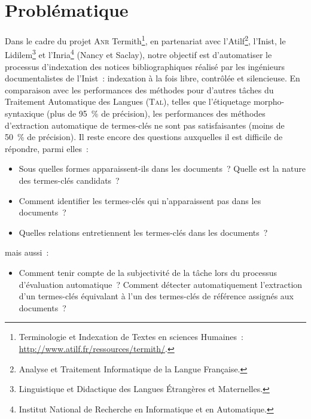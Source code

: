    \section{Problématique}
      Dans le cadre du projet \textsc{Anr} Termith\footnote{Terminologie et
      Indexation de Textes en sciences Humaines~:
      \url{http://www.atilf.fr/ressources/termith/}.}, en partenariat avec
      l'Atilf\footnote{Analyse et Traitement Informatique de la Langue
      Française.}, l'Inist, le Lidilem\footnote{Linguistique et Didactique des
      Langues Étrangères et Maternelles.} et l'Inria\footnote{Institut National
      de Recherche en Informatique et en Automatique.} (Nancy et Saclay), notre
      objectif est d'automatiser le processus d'indexation des notices
      bibliographiques réalisé par les ingénieurs documentalistes de l'Inist~:
      indexation à la fois libre, contrôlée et silencieuse. En comparaison avec
      les performances des méthodes pour d'autres tâches du Traitement
      Automatique des Langues (\textsc{Tal}), telles que l'étiquetage
      morpho-syntaxique (plus de 95~\% de précision), les performances des
      méthodes d'extraction automatique de termes-clés ne sont pas
      satisfaisantes (moins de 50~\% de précision). Il reste encore des
      questions auxquelles il est difficile de répondre, parmi elles~:
      \begin{itemize}
        \item{Sous quelles formes apparaissent-ils dans les documents~? Quelle
              est la nature des termes-clés candidats~?}
        \item{Comment identifier les termes-clés qui n'apparaissent pas dans les
              documents~?}
        \item{Quelles relations entretiennent les termes-clés dans les
              documents~?}
      \end{itemize}
      mais aussi~:
      \begin{itemize}
        \item{Comment tenir compte de la subjectivité de la tâche lors du
              processus d'évaluation automatique~? Comment détecter
              automatiquement l'extraction d'un termes-clés équivalant à l'un
              des termes-clés de référence assignés aux documents~?}
      \end{itemize}


